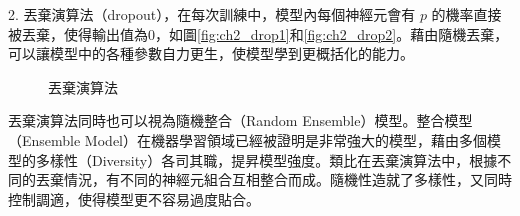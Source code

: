 \begin{itemize}
2. 丟棄演算法（dropout），在每次訓練中，模型內每個神經元會有 $ p $ 的機率直接被丟棄，使得輸出值為0，如圖\ref{fig:ch2_drop1}和\ref{fig:ch2_drop2}。藉由隨機丟棄，可以讓模型中的各種參數自力更生，使模型學到更概括化的能力。

\begin{figure}[ht]
\centering
{}
\caption{丟棄演算法}
\end{figure}
	丟棄演算法同時也可以視為隨機整合（Random Ensemble）模型。整合模型
	（Ensemble Model）在機器學習領域已經被證明是非常強大的模型，藉由多個模型的多樣性（Diversity）各司其職，提昇模型強度。類比在丟棄演算法中，根據不同的丟棄情況，有不同的神經元組合互相整合而成。隨機性造就了多樣性，又同時控制調適，使得模型更不容易過度貼合。


\end{itemize}
